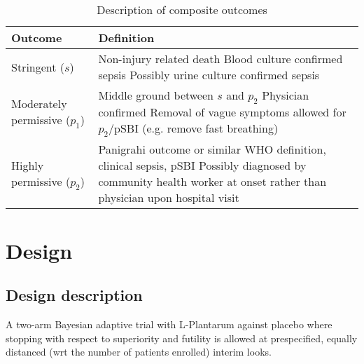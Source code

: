 \documentclass[12pt]{article}
\begin{document}
\begin{table}
\begin{tabular} {|l | p{10.5cm}|}
	\hline
	Outcome & Definition\\
	\hline
Stringent ($s$) &	Non-injury related death
\newline
                        Blood culture confirmed sepsis
\newline
                        Possibly urine culture confirmed sepsis
\\
    \hline
Moderately permissive ($p_1$)	& Middle ground between $s$ and $p_2$
\newline
                                                     Physician confirmed
\newline
                                                     Removal of vague symptoms allowed for $p_2$/pSBI
\newline
                                                     (e.g. remove fast breathing)
\\
      \hline
Highly permissive ($p_2$)	& Panigrahi outcome or similar
\newline
                                               WHO definition, clinical sepsis, pSBI
\newline
                                               Possibly diagnosed by community health worker at onset rather than physician upon hospital visit
\\
        \hline
\end{tabular}

   \caption{ Description of composite outcomes}
\label{t1}  
\end{table}






\section{Design}\label{Sec:design}
\subsection{Design description}
A two-arm Bayesian adaptive trial with L-Plantarum against placebo where stopping with respect to superiority and futility is allowed at prespecified, equally distanced (wrt the number of patients enrolled) interim looks. 
\end{document}
